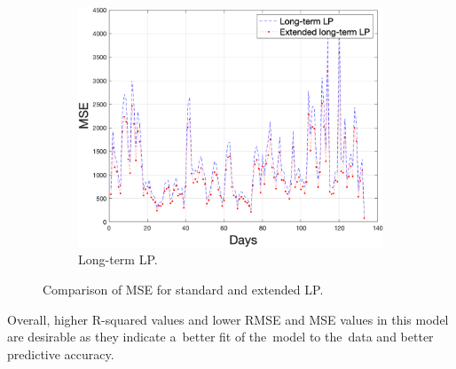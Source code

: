 \begin{figure}[!ht]
\begin{subfigure}[b]{0.4\textwidth}
            \includegraphics[width=1\textwidth]{figures/mseLLP.png}
            \caption{Long-term LP.}
            \label{fig:ltlpmse}
        \end{subfigure}
        \caption{Comparison of MSE for standard and extended LP.}
        \label{fig:mseresult}
    \end{figure}
    Overall, higher R-squared values and lower RMSE and MSE values in this model are
    desirable as they indicate a~better fit of the~model to the~data and better predictive accuracy.
    
